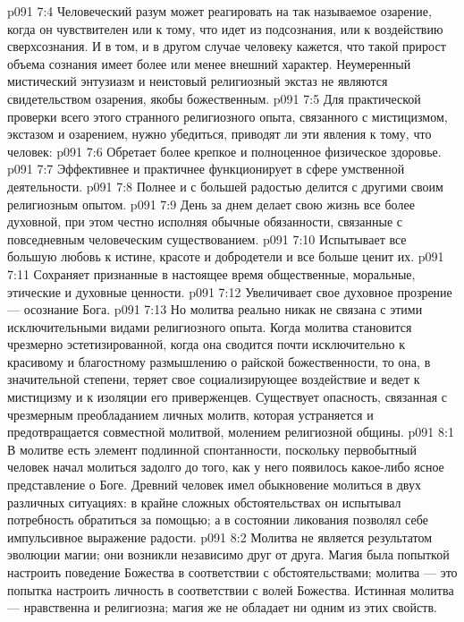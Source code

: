 \vs p091 7:4 Человеческий разум может реагировать на так называемое озарение, когда он чувствителен или к тому, что идет из подсознания, или к воздействию сверхсознания. И в том, и в другом случае человеку кажется, что такой прирост объема сознания имеет более или менее внешний характер. Неумеренный мистический энтузиазм и неистовый религиозный экстаз не являются свидетельством озарения, якобы божественным.
\vs p091 7:5 Для практической проверки всего этого странного религиозного опыта, связанного с мистицизмом, экстазом и озарением, нужно убедиться, приводят ли эти явления к тому, что человек:
\vs p091 7:6 \bibnobreakspace Обретает более крепкое и полноценное физическое здоровье.
\vs p091 7:7 \bibnobreakspace Эффективнее и практичнее функционирует в сфере умственной деятельности.
\vs p091 7:8 \bibnobreakspace Полнее и с большей радостью делится с другими своим религиозным опытом.
\vs p091 7:9 \bibnobreakspace День за днем делает свою жизнь все более духовной, при этом честно исполняя обычные обязанности, связанные с повседневным человеческим существованием.
\vs p091 7:10 \bibnobreakspace Испытывает все большую любовь к истине, красоте и добродетели и все больше ценит их.
\vs p091 7:11 \bibnobreakspace Сохраняет признанные в настоящее время общественные, моральные, этические и духовные ценности.
\vs p091 7:12 \bibnobreakspace Увеличивает свое духовное прозрение --- осознание Бога.
\vs p091 7:13 \pc Но молитва реально никак не связана с этими исключительными видами религиозного опыта. Когда молитва становится чрезмерно эстетизированной, когда она сводится почти исключительно к красивому и благостному размышлению о райской божественности, то она, в значительной степени, теряет свое социализирующее воздействие и ведет к мистицизму и к изоляции его приверженцев. Существует опасность, связанная с чрезмерным преобладанием личных молитв, которая устраняется и предотвращается совместной молитвой, молением религиозной общины.
\vs p091 8:1 В молитве есть элемент подлинной спонтанности, поскольку первобытный человек начал молиться задолго до того, как у него появилось какое\hyp{}либо ясное представление о Боге. Древний человек имел обыкновение молиться в двух различных ситуациях: в крайне сложных обстоятельствах он испытывал потребность обратиться за помощью; а в состоянии ликования позволял себе импульсивное выражение радости.
\vs p091 8:2 \pc Молитва не является результатом эволюции магии; они возникли независимо друг от друга. Магия была попыткой настроить поведение Божества в соответствии с обстоятельствами; молитва --- это попытка настроить личность в соответствии с волей Божества. Истинная молитва --- нравственна и религиозна; магия же не обладает ни одним из этих свойств.
